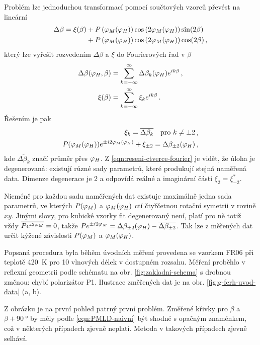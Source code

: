 Problém lze jednoduchou transformací pomocí součtových vzorců převést na lineární
\begin{align}
\label{eqn:PMLD-linearizovane}
\Delta\beta =\xi(\beta) &+ P\left(\varphi_M(\varphi_H)\right)\cos\left(2\varphi_M(\varphi_H)\right)\sin(2\beta) 
           \\&+P\left(\varphi_M(\varphi_H)\right)\cos\left(2\varphi_M(\varphi_H)\right)\cos(2\beta) \,,
\end{align}
který lze vyřešit rozvedením $\Delta\beta$ a $\xi$ do Fourierových řad v $\beta$
\begin{align}
    \Delta\beta(\varphi_H, \beta) &= \sum_{k=-\infty}^\infty \Delta\beta_k(\varphi_H) e^{ik\beta} \,,\\
    \xi(\beta) &= \sum_{k=-\infty}^\infty \xi_k e^{ik\beta}  \,.
\end{align}
Řešením je pak
\begin{align}
    \xi_k = \overline{\Delta\beta_{k}} \quad \textrm{pro} \,\, k\neq\pm2 \,,\\
    P(\varphi_M(\varphi_H)) e^{\pm i2\varphi_M(\varphi_H)} + \xi_{\pm2} = \Delta\beta_{\pm2}(\varphi_H) \,,\label{eqn:reseni-ctverce-fourier}
\end{align}
kde $\overline{\Delta\beta_k}$ značí průměr přes $\varphi_H$.
Z \eqref{eqn:reseni-ctverce-fourier} je vidět, že úloha je degenerovaná: existují různé sady parametrů, které produkují stejná naměřená data.
Dimenze degenerace je 2 a odpovídá reálné a imaginární části $\xi_2=\xi_{-2}^*$.

Nicméně pro každou sadu naměřených dat existuje maximálně jedna sada parametrů, ve kterých $P(\varphi_M)$ a $\varphi_M(\varphi_H)$ ctí čtyřčetnou rotační symetrii v rovině $xy$.
Jinými slovy, pro kubické vzorky fit degenerovaný není, platí pro ně totiž vždy $\overline{Pe^{i2\varphi_M}}=0$, takže $Pe^{\pm i2\varphi_M}=\Delta\beta_{\pm2}(\varphi_H)-\overline{\Delta\beta_{\pm2}}$.
Tak lze z měřených dat určit kýžené závislosti $P(\varphi_M)$ a $\varphi_M(\varphi_H)$.

Popsaná procedura byla běhěm úvodních měření provedena se vzorkem FR06 při teplotě \SI{420}{\kelvin} pro 10 vlnových délek v dostupném rozsahu.
Měření proběhlo v reflexní geometrii podle schématu na obr. \ref{fig:zakladni-schema} s drobnou změnou: chybí polarizátor P1.
Ilustrace změřených dat je na obr. \ref{fig:g-ferh-uvod-data} (a, b).

Z obrázku je na první pohled patrný první problém.
Změřené křivky pro $\beta$ a $\beta+\SI{90}{\degree}$ by měly podle \eqref{eqn:PMLD-naivni} být shodné s opačným znaménkem, což v některých případech zjevně neplatí.
Metoda v takových případech zjevně selhává.

